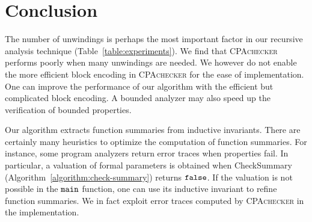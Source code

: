 
\chapter{Conclusion}\label{ch:conclusion}


The number of unwindings is perhaps the most important factor in our
recursive analysis technique (Table~\ref{table:experiments}). We find
that \textsc{CPAchecker} performs poorly when many unwindings are
needed. We however do not enable the more efficient block encoding in
\textsc{CPAchecker} for the ease of implementation. One can improve
the performance of our algorithm with the efficient but complicated
block encoding. A bounded analyzer may also speed up the
verification of bounded properties. 

Our algorithm extracts function summaries from inductive invariants. 
There are certainly many heuristics to optimize the computation of
function summaries. For instance, some program analyzers return error
traces when properties fail. In particular, a valuation of formal
parameters is obtained when \textmd{CheckSummary}
(Algorithm~\ref{algorithm:check-summary}) returns $\mathtt{false}$. If the
valuation is not possible in the $\mathtt{{main}}$ function, one can use
its inductive invariant to refine function summaries. We in 
fact exploit error traces computed by \textsc{CPAchecker} in the
implementation. 
